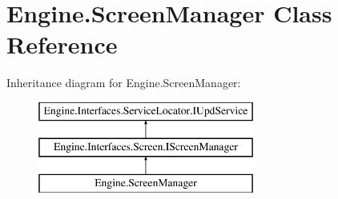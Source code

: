 \hypertarget{a00538}{}\section{Engine.\+Screen\+Manager Class Reference}
\label{a00538}
Inheritance diagram for Engine.\+Screen\+Manager\+:\begin{figure}[H]
\begin{center}
\leavevmode
\includegraphics[height=3.000000cm]{dd/d5a/a00538}
\end{center}
\end{figure}
